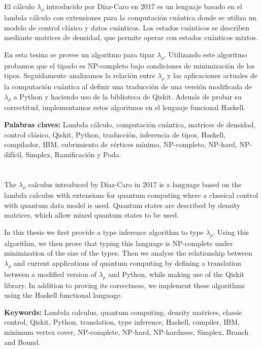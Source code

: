 
\chapter*{} %

El cálculo $\lambda_\rho$ introducido por Díaz-Caro en 2017 es un lenguaje basado en el lambda cálculo con extensiones para la computación cuántica donde se utiliza un modelo de control clásico y datos cuánticos. Los estados cuánticos se describen mediante matrices de densidad, que permite operar con estados cuánticos mixtos.

En esta tesina se provee un algoritmo para tipar $\lambda_\rho$. Utilizando este algoritmo probamos que el tipado es NP-completo bajo condiciones de minimización de los tipos. Seguidamente analizamos la relación entre $\lambda_\rho$ y las aplicaciones actuales de la computación cuántica al definir una traducción de una versión modificada de $\lambda_\rho$ a Python y haciendo uso de la biblioteca de Qiskit. Además de probar su correctitud, implementamos estos algoritmos en el lenguaje funcional Haskell.

\textbf{Palabras claves:} Lambda cálculo, computación cuántica, matrices de densidad, control clásico, Qiskit, Python, traducción, inferencia de tipos, Haskell, compilador, IBM, cubrimiento de vértices mínimo, NP-completo, NP-hard, NP-difícil, Simplex, Ramificación y Poda.


\chapter*{} %
The $\lambda_\rho$ calculus introduced by Díaz-Caro in 2017 is a language based on the lambda calculus with extensions for quantum computing where a classical control with quantum data model is used. Quantum states are described by density matrices, which allow mixed quantum states to be used.

In this thesis we first provide a type inference algorithm to type $\lambda_\rho$. Using this algorithm, we then prove that typing this language is NP-complete under minimization of the size of the types. Then we analyse the relationship between $\lambda_\rho$ and current applications of quantum computing by defining a translation between a modified version of $\lambda_\rho$ and Python, while making use of the Qiskit library. In addition to proving its correctness, we implement these algorithms using the Haskell functional language.


\textbf{Keywords:} Lambda calculus, quantum computing, density matrices, classic control, Qiskit, Python, translation, type inference, Haskell, compiler, IBM, minimum vertex cover, NP-complete, NP-hard, NP-hardness, Simplex, Branch and Bound.